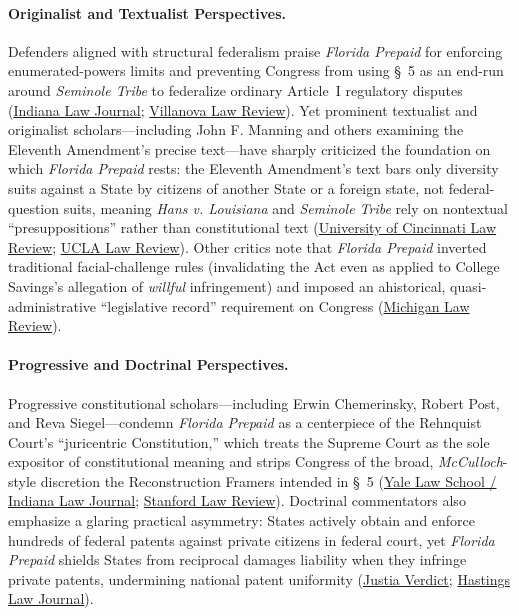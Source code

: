 \documentclass[12pt]{article}
\begin{document}
\paragraph{Originalist and Textualist Perspectives.}
Defenders aligned with structural federalism praise \textit{Florida Prepaid} for enforcing enumerated-powers limits and preventing Congress from using \S~5 as an end-run around \textit{Seminole Tribe} to federalize ordinary Article~I regulatory disputes (\href{https://www.repository.law.indiana.edu/cgi/viewcontent.cgi?article=1843&context=ilj}{Indiana Law Journal}; \href{https://digitalcommons.law.villanova.edu/cgi/viewcontent.cgi?article=3073&context=vlr}{Villanova Law Review}). Yet prominent textualist and originalist scholars---including John F. Manning and others examining the Eleventh Amendment's precise text---have sharply criticized the foundation on which \textit{Florida Prepaid} rests: the Eleventh Amendment's text bars only diversity suits against a State by citizens of another State or a foreign state, not federal-question suits, meaning \textit{Hans v. Louisiana} and \textit{Seminole Tribe} rely on nontextual ``presuppositions'' rather than constitutional text (\href{https://scholarship.law.uc.edu/cgi/viewcontent.cgi?article=1475&context=uclr}{University of Cincinnati Law Review}; \href{https://www.uclalawreview.org/wp-content/uploads/2019/09/47_50UCLALRev10312002-2003.pdf}{UCLA Law Review}). Other critics note that \textit{Florida Prepaid} inverted traditional facial-challenge rules (invalidating the Act even as applied to College Savings's allegation of \textit{willful} infringement) and imposed an ahistorical, quasi-administrative ``legislative record'' requirement on Congress (\href{https://repository.law.umich.edu/cgi/viewcontent.cgi?article=1794&context=mlr}{Michigan Law Review}).

\paragraph{Progressive and Doctrinal Perspectives.}
Progressive constitutional scholars---including Erwin Chemerinsky, Robert Post, and Reva Siegel---condemn \textit{Florida Prepaid} as a centerpiece of the Rehnquist Court's ``juricentric Constitution,'' which treats the Supreme Court as the sole expositor of constitutional meaning and strips Congress of the broad, \textit{McCulloch}-style discretion the Reconstruction Framers intended in \S~5 (\href{https://law.yale.edu/sites/default/files/documents/pdf/Faculty/Siegel_ProtectingTheConstitutionFromThePeople.pdf}{Yale Law School / Indiana Law Journal}; \href{http://www.stanfordlawreview.org/wp-content/uploads/sites/3/2010/04/chemerinsky.pdf}{Stanford Law Review}). Doctrinal commentators also emphasize a glaring practical asymmetry: States actively obtain and enforce hundreds of federal patents against private citizens in federal court, yet \textit{Florida Prepaid} shields States from reciprocal damages liability when they infringe private patents, undermining national patent uniformity (\href{https://verdict.justia.com/2020/04/10/how-allen-v-cooper-breaks-important-new-if-dubious-ground-on-stare-decisis}{Justia Verdict}; \href{https://repository.uclawsf.edu/cgi/viewcontent.cgi?article=3736&context=hastings_law_journal}{Hastings Law Journal}).
\end{document}
